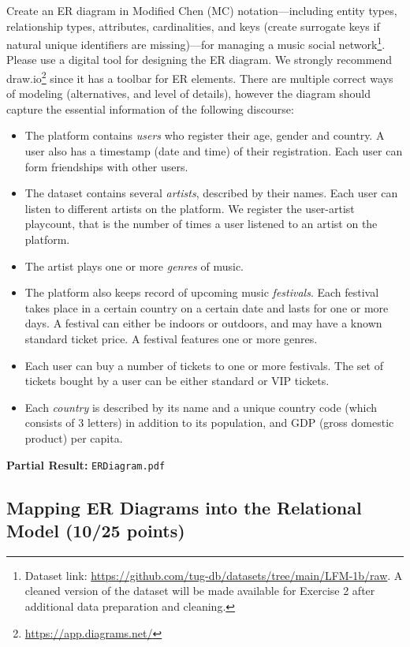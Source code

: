 \documentclass[
        a4paper,
        pdftex,
        english, 
        oneside,%
        listof=totoc,%
        bibliography=totoc, %
        titlepage,
        abstracton 
]{scrartcl} %
\begin{document}
Create an ER diagram in Modified Chen (MC) notation---including entity types, relationship types, attributes, cardinalities, and keys (create surrogate keys if natural unique identifiers are missing)---for managing a music social network\footnote{Dataset link: \url{https://github.com/tug-db/datasets/tree/main/LFM-1b/raw}. A cleaned version of the dataset will be made available for Exercise 2 after additional data preparation and cleaning.}.
Please use a digital tool for designing the ER diagram. We strongly recommend draw.io\footnote{\url{https://app.diagrams.net/}} since it has a toolbar for ER elements.
There are multiple correct ways of modeling (alternatives, and level of details), however the diagram should capture the essential information of the following discourse:
\begin{itemize}
\item The platform contains \textit{users} who register their age, gender and country. A user also has a timestamp (date and time) of their registration. Each user can form friendships with other users.
\item The dataset contains several \textit{artists}, described by their names. Each user can listen to different artists on the platform. We register the user-artist playcount, that is the number of times a user listened to an artist on the platform.
\item The artist plays one or more \textit{genres} of music.
\item The platform also keeps record of upcoming music \textit{festivals}. Each festival takes place in a certain country on a certain date and lasts for one or more days. A festival can either be indoors or outdoors, and may have a known standard ticket price. A festival features one or more genres.
\item Each user can buy a number of tickets to one or more festivals. The set of tickets bought by a user can be either standard or VIP tickets.
\item Each \textit{country} is described by its name and a unique country code (which consists of 3 letters) in addition to its population, and GDP (gross domestic product) per capita.
\end{itemize}

\noindent \textbf{Partial Result:} \texttt{ERDiagram.pdf}

\subsection{Mapping ER Diagrams into the Relational Model (10/25 points)}
\label{sec:RM}
\end{document}
